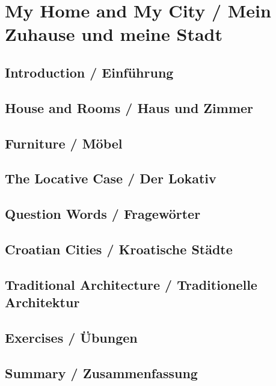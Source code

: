 \chapter{My Home and My City / Mein Zuhause und meine Stadt}

\section{Introduction / Einführung}

\section{House and Rooms / Haus und Zimmer}

\section{Furniture / Möbel}

\section{The Locative Case / Der Lokativ}

\section{Question Words / Fragewörter}

\section{Croatian Cities / Kroatische Städte}

\section{Traditional Architecture / Traditionelle Architektur}

\section{Exercises / Übungen}

\section{Summary / Zusammenfassung}
